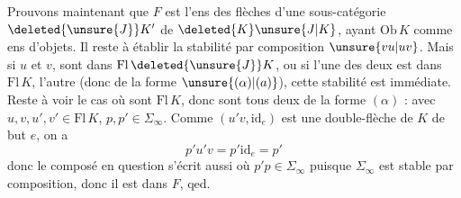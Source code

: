 Prouvons maintenant que $F$ est l'ens des flèches d'une sous-catégorie $\deleted{\unsure{J}}K'$ de $\deleted{K}\unsure{J|K}$, ayant $\mathrm{Ob}\,K$ comme ens d'objets. Il reste à établir la stabilité par composition $\unsure{vu|uv}$. Mais si $u$ et $v$,  sont dans $\mathrm{Fl}\,\deleted{\unsure{J}}K$,  ou si l'une des deux est dans $\mathrm{Fl}\,K$, l'autre  (donc de la forme $\unsure{(\alpha)|(a)}$), cette stabilité est immédiate. Reste à voir le cas où  sont   $\mathrm{Fl}\,K$, donc sont tous deux de la forme $(\alpha)$ :
avec $u,v,u',v'\in\mathrm{Fl}\,K$, $p,p'\in\Sigma_{\infty}$. Comme $(u'v,\mathrm{id}_e)$ est une double-flèche de
$K$ de but $e$, on a
\[
p'u'v=p'\mathrm{id}_e=p'
\]
donc le composé en question s'écrit aussi
où $p'p\in\Sigma_\infty$ puisque $\Sigma_\infty$ est stable par composition, donc il est dans  $F$, qed.

